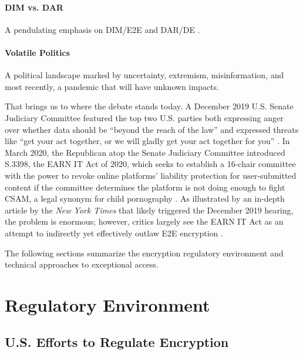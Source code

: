 \paragraph*{\ac{DIM} vs. \ac{DAR}} A pendulating emphasis on DIM/E2E and DAR/DE \cite{schneier_2019}.

\paragraph*{Volatile Politics} A political landscape marked by uncertainty, extremism, misinformation, and most
recently, a pandemic that will have unknown impacts.

That brings us to where the debate stands today. A December 2019 U.S. Senate Judiciary Committee featured the top two
U.S. parties both expressing anger over whether data should be ``beyond the reach of the law'' and expressed threats
like ``get your act together, or we will gladly get your act together for you'' \cite{geller_2019}. In March 2020, the
Republican atop the Senate Judiciary Committee introduced S.3398, the EARN IT Act of 2020, which seeks to establish a
16-chair committee with the power to revoke online platforms' liability protection for user-submitted content if the
committee determines the platform is not doing enough to fight \ac{CSAM}, a legal synonym for
child pornography \cite{graham_s3398_2020}. As illustrated by an in-depth article by the \textit{New York Times}
\cite{keller_internet_2019} that likely triggered the December 2019 hearing, the problem is enormous; however, critics
largely see the EARN IT Act as an attempt to indirectly yet effectively outlaw \ac{E2E} encryption \cite{newman_2020}
\cite{pfefferkorn_2020}.


The following sections summarize the encryption regulatory environment and technical approaches to exceptional access.


\section{Regulatory Environment}
\label{sec-reg-environment}

\subsection{U.S. Efforts to Regulate Encryption}

